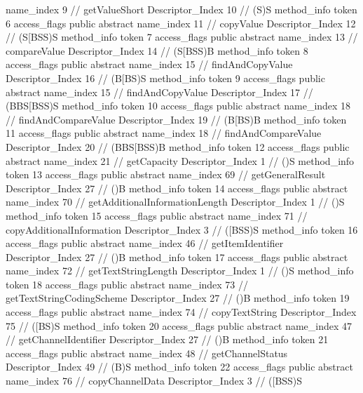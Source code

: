 {{{{{					name_index	9		// getValueShort
					Descriptor_Index	10		// (S)S
				}
				method_info {
					token	6
					access_flags	public abstract
					name_index	11		// copyValue
					Descriptor_Index	12		// (S[BSS)S
				}
				method_info {
					token	7
					access_flags	public abstract
					name_index	13		// compareValue
					Descriptor_Index	14		// (S[BSS)B
				}
				method_info {
					token	8
					access_flags	public abstract
					name_index	15		// findAndCopyValue
					Descriptor_Index	16		// (B[BS)S
				}
				method_info {
					token	9
					access_flags	public abstract
					name_index	15		// findAndCopyValue
					Descriptor_Index	17		// (BBS[BSS)S
				}
				method_info {
					token	10
					access_flags	public abstract
					name_index	18		// findAndCompareValue
					Descriptor_Index	19		// (B[BS)B
				}
				method_info {
					token	11
					access_flags	public abstract
					name_index	18		// findAndCompareValue
					Descriptor_Index	20		// (BBS[BSS)B
				}
				method_info {
					token	12
					access_flags	public abstract
					name_index	21		// getCapacity
					Descriptor_Index	1		// ()S
				}
				method_info {
					token	13
					access_flags	public abstract
					name_index	69		// getGeneralResult
					Descriptor_Index	27		// ()B
				}
				method_info {
					token	14
					access_flags	public abstract
					name_index	70		// getAdditionalInformationLength
					Descriptor_Index	1		// ()S
				}
				method_info {
					token	15
					access_flags	public abstract
					name_index	71		// copyAdditionalInformation
					Descriptor_Index	3		// ([BSS)S
				}
				method_info {
					token	16
					access_flags	public abstract
					name_index	46		// getItemIdentifier
					Descriptor_Index	27		// ()B
				}
				method_info {
					token	17
					access_flags	public abstract
					name_index	72		// getTextStringLength
					Descriptor_Index	1		// ()S
				}
				method_info {
					token	18
					access_flags	public abstract
					name_index	73		// getTextStringCodingScheme
					Descriptor_Index	27		// ()B
				}
				method_info {
					token	19
					access_flags	public abstract
					name_index	74		// copyTextString
					Descriptor_Index	75		// ([BS)S
				}
				method_info {
					token	20
					access_flags	public abstract
					name_index	47		// getChannelIdentifier
					Descriptor_Index	27		// ()B
				}
				method_info {
					token	21
					access_flags	public abstract
					name_index	48		// getChannelStatus
					Descriptor_Index	49		// (B)S
				}
				method_info {
					token	22
					access_flags	public abstract
					name_index	76		// copyChannelData
					Descriptor_Index	3		// ([BSS)S
				}
}}}}
